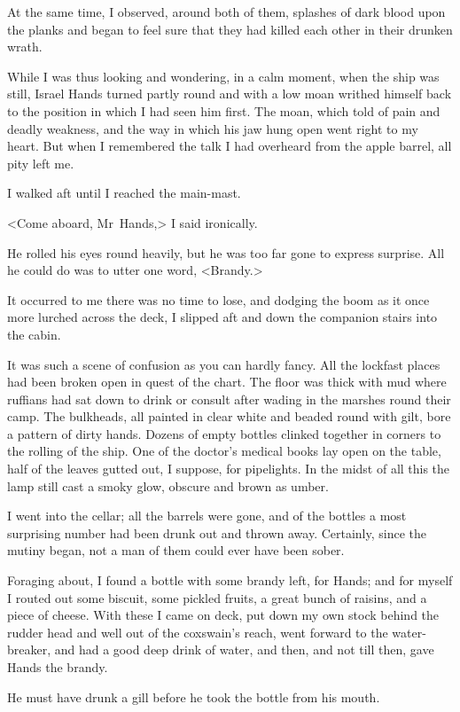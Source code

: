 At the same time, I observed, around both of them, splashes of dark blood upon the planks and began to feel sure that they had killed each other in their drunken wrath.

While I was thus looking and wondering, in a calm moment, when the ship was still, Israel Hands turned partly round and with a low moan writhed himself back to the position in which I had seen him first. The moan, which told of pain and deadly weakness, and the way in which his jaw hung open went right to my heart. But when I remembered the talk I had overheard from the apple barrel, all pity left me.

I walked aft until I reached the main-mast.

<Come aboard, Mr~Hands,> I said ironically.

He rolled his eyes round heavily, but he was too far gone to express surprise. All he could do was to utter one word, <Brandy.>

It occurred to me there was no time to lose, and dodging the boom as it once more lurched across the deck, I slipped aft and down the companion stairs into the cabin.

It was such a scene of confusion as you can hardly fancy. All the lockfast places had been broken open in quest of the chart. The floor was thick with mud where ruffians had sat down to drink or consult after wading in the marshes round their camp. The bulkheads, all painted in clear white and beaded round with gilt, bore a pattern of dirty hands. Dozens of empty bottles clinked together in corners to the rolling of the ship. One of the doctor's medical books lay open on the table, half of the leaves gutted out, I suppose, for pipelights. In the midst of all this the lamp still cast a smoky glow, obscure and brown as umber.

I went into the cellar; all the barrels were gone, and of the bottles a most surprising number had been drunk out and thrown away. Certainly, since the mutiny began, not a man of them could ever have been sober.

Foraging about, I found a bottle with some brandy left, for Hands; and for myself I routed out some biscuit, some pickled fruits, a great bunch of raisins, and a piece of cheese. With these I came on deck, put down my own stock behind the rudder head and well out of the coxswain's reach, went forward to the water-breaker, and had a good deep drink of water, and then, and not till then, gave Hands the brandy.

He must have drunk a gill before he took the bottle from his mouth.

